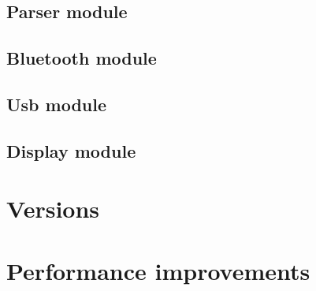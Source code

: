 		\subsection{Parser module}
		
		\subsection{Bluetooth module}
		
		\subsection{Usb module}
		
		\subsection{Display module}
		
		
	\section{Versions}
	
		
	\section{Performance improvements}

